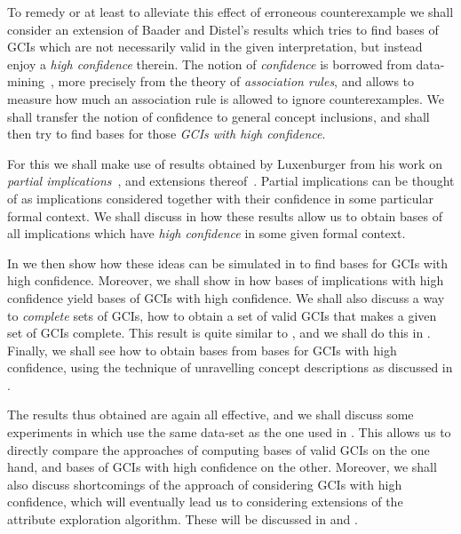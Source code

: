 To remedy or at least to alleviate this effect of erroneous counterexample we shall
consider an extension of Baader and Distel's results which tries to find bases of GCIs
which are not necessarily valid in the given interpretation, but instead enjoy a
\emph{high confidence} therein.  The notion of \emph{confidence} is borrowed from
data-mining~\cite{arules:agrawal:association-rules}, more precisely from the theory of
\emph{association rules}, and allows to measure how much an association rule is allowed to
ignore counterexamples.  We shall transfer the notion of confidence to general concept
inclusions, and shall then try to find bases for those \emph{GCIs with high confidence}.

For this we shall make use of results obtained by Luxenburger from his work on
\emph{partial implications}~\cite{diss:Luxenburger,Luxenburger91}, and extensions
thereof~\cite{DBLP:conf/ki/StummeTBPL01}.  Partial implications can be thought of as
implications considered together with their confidence in some particular formal context.
We shall discuss in  how these results allow us to obtain bases of all
implications which have \emph{high confidence} in some given formal context.

In  we then show how these ideas can be simulated in \ELgfpbot to
find bases for GCIs with high confidence.  Moreover, we shall show in
 how bases of implications with high confidence yield bases
of GCIs with high confidence.  We shall also discuss a way to \emph{complete} sets of
GCIs, \ie how to obtain a set of valid GCIs that makes a given set of GCIs complete.  This
result is quite similar to , and we shall do this in
.  Finally, we shall see how to obtain \ELbot bases from
\ELgfpbot bases for GCIs with high confidence, using the technique of unravelling
\ELgfpbot concept descriptions as discussed in .

The results thus obtained are again all effective, and we shall discuss some experiments
in  which use the same data-set as the one used in
.  This allows us to directly compare the approaches of
computing bases of valid GCIs on the one hand, and bases of GCIs with high confidence on
the other.  Moreover, we shall also discuss shortcomings of the approach of considering
GCIs with high confidence, which will eventually lead us to considering extensions of the
attribute exploration algorithm.  These will be discussed in  and
.

